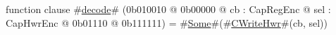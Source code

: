 function clause #\hyperref[sailMIPSzdecode]{decode}# (0b010010 @ 0b00000 @ cb : CapRegEnc @ sel : CapHwrEnc @   0b01110 @ 0b111111) = #\hyperref[sailMIPSzSome]{Some}#(#\hyperref[sailMIPSzCWriteHwr]{CWriteHwr}#(cb, sel))
